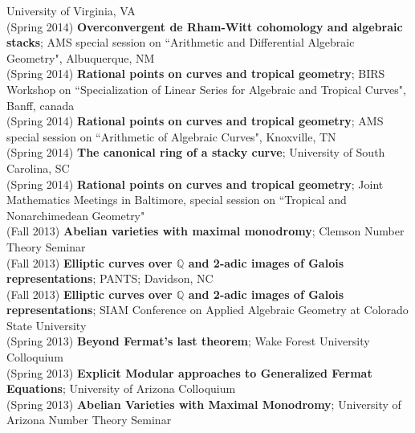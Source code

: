 \documentclass[margin,line]{res}
\begin{document}
\begin{resume}
University of Virginia, VA
\vspace{.05cm}\\
(Spring 2014) \textbf{Overconvergent de Rham-Witt cohomology and algebraic stacks};  
AMS special session on ``Arithmetic and Differential Algebraic Geometry", Albuquerque, NM
\vspace{.05cm}\\
(Spring 2014) \textbf{Rational points on curves and tropical geometry};  
BIRS Workshop on ``Specialization of Linear Series for Algebraic and Tropical Curves", Banff, canada
\vspace{.05cm}\\
(Spring 2014) \textbf{Rational points on curves and tropical geometry};  
AMS special session on ``Arithmetic of Algebraic Curves", Knoxville, TN
\vspace{.05cm}\\
(Spring 2014) \textbf{The canonical ring of a stacky curve};  
University of South Carolina, SC
\vspace{.05cm}\\
(Spring 2014) \textbf{Rational points on curves and tropical geometry};  
Joint Mathematics Meetings in Baltimore, special session on ``Tropical and Nonarchimedean Geometry"  
\vspace{.05cm}\\
(Fall 2013) \textbf{Abelian varieties with maximal monodromy};  
Clemson Number Theory Seminar 
\vspace{.05cm}\\
(Fall 2013) \textbf{Elliptic curves over $\mathbb{Q}$ and 2-adic images of Galois representations};  
PANTS; Davidson, NC
\vspace{.05cm}\\
(Fall 2013) \textbf{Elliptic curves over $\mathbb{Q}$ and 2-adic images of Galois representations};  
SIAM Conference on Applied Algebraic Geometry at Colorado State University 
\vspace{.05cm}\\
(Spring 2013) \textbf{Beyond Fermat's last theorem};
Wake Forest University Colloquium
\vspace{.05cm}\\
(Spring 2013) \textbf{Explicit Modular approaches to Generalized Fermat Equations};
University of Arizona Colloquium
\vspace{.05cm}\\
(Spring 2013) \textbf{Abelian Varieties with Maximal Monodromy};
University of Arizona Number Theory Seminar 
\vspace{.05cm}\\

\end{resume}
\end{document}
